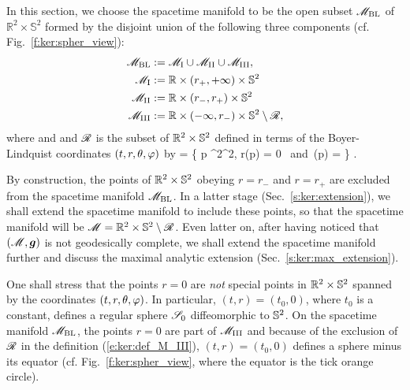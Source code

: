 In this section, we choose the spacetime manifold to be the open subset $\mathscr{M}_{\rm BL}$
of $\mathbb{R}^2\times\mathbb{S}^2$ formed by the disjoint union of
the following three components (cf. Fig.~\ref{f:ker:spher_view}):
\begin{subequations}
\begin{align}
    \mathscr{M}_{\rm BL} & :=  \mathscr{M}_{\rm I} \cup \mathscr{M}_{\rm II} \cup \mathscr{M}_{\rm III} , \\
    \mathscr{M}_{\rm I} & :=  \mathbb{R}\times(r_+,+\infty)\times\mathbb{S}^2 \label{e:ker:def_M_I}\\
    \mathscr{M}_{\rm II} & :=  \mathbb{R}\times(r_-,r_+)\times\mathbb{S}^2 \\
    \mathscr{M}_{\rm III} & :=  \mathbb{R}\times(-\infty,r_-)\times\mathbb{S}^2 \setminus \mathscr{R}, \label{e:ker:def_M_III}
\end{align}
\end{subequations}
where
\be \label{e:ker:def_r_pm}
     \quad\mbox{and}\quad  {}
\ee
and $\mathscr{R}$ is the subset of $\mathbb{R}^2\times\mathbb{S}^2$ defined in terms of the Boyer-Lindquist coordinates $(t,r,\theta,\varphi)$ by
\be \label{e:ker:def_ring}
    \ring = \left\{ p \in \R^2\times\SS^2,
        \quad r(p) = 0 \ \mbox{and}\ \th(p) =  \right\} .
\ee
\begin{remark}
By construction, the points of $\mathbb{R}^2\times\mathbb{S}^2$ obeying $r=r_-$ and $r=r_+$ are
excluded from the spacetime manifold $\mathscr{M}_{\rm BL}$. In a latter stage
(Sec.~\ref{s:ker:extension}), we shall extend the spacetime manifold to
include these points, so that the spacetime manifold will be $\mathscr{M} = \mathbb{R}^2\times\mathbb{S}^2\setminus \mathscr{R}$. Even latter on, after having noticed that $(\mathscr{M},\bm{g})$ is not geodesically complete,
we shall extend the spacetime manifold further and discuss the maximal analytic
extension (Sec.~\ref{s:ker:max_extension}).
\end{remark}

\begin{remark} \label{r:ker:r_zero}
One shall stress that the points $r=0$ are \emph{not} special points in
$\mathbb{R}^2\times\mathbb{S}^2$ spanned by the coordinates $(t,r,\theta,\varphi)$. In particular,
$(t,r) = (t_0, 0)$, where $t_0$ is a constant, defines a regular sphere
$\mathscr{S}_0$ diffeomorphic to $\mathbb{S}^2$. On the spacetime manifold $\mathscr{M}_{\rm BL}$, the
points $r=0$ are part of $\mathscr{M}_{\rm III}$ and because of the exclusion of $\mathscr{R}$
in the definition (\ref{e:ker:def_M_III}), $(t,r) = (t_0, 0)$ defines
a sphere minus its equator (cf. Fig.~\ref{f:ker:spher_view}, where the equator
is the tick orange circle).
\end{remark}

